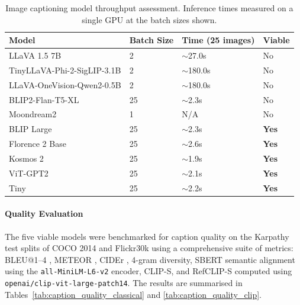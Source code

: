 \begin{table}[ht]
	\centering
	\caption{Image captioning model throughput assessment. Inference times 
		measured on a single GPU at the batch sizes shown.}
	\label{tab:caption_viability}
	\begin{tabular}{llll}
		\hline
		\textbf{Model} & \textbf{Batch Size} & \textbf{Time (25 images)} & 
		\textbf{Viable} \\
		\hline
		LLaVA 1.5 7B \cite{Liu_2023_LLaVA}      & 2  & $\sim$27.0s   & No \\
		TinyLLaVA-Phi-2-SigLIP-3.1B              & 2  & $\sim$180.0s  & No \\
		LLaVA-OneVision-Qwen2-0.5B               & 2  & $\sim$180.0s  & No \\
		BLIP2-Flan-T5-XL \cite{Li_2023_BLIP2}    & 25 & $\sim$2.3s    & No \\
		Moondream2                                & 1  & N/A           & No \\
		BLIP Large \cite{Li_2022_BLIP}           & 25 & $\sim$2.3s    & \textbf{Yes} \\
		Florence 2 Base \cite{Xiao_2024_Florence2}& 25 & $\sim$2.6s    & \textbf{Yes} \\
		Kosmos 2 \cite{Peng_2023_Kosmos2}        & 25 & $\sim$1.9s    & \textbf{Yes} \\
		ViT-GPT2                                  & 25 & $\sim$2.1s    & \textbf{Yes} \\
		Tiny                                      & 25 & $\sim$2.2s    & \textbf{Yes} \\
		\hline
	\end{tabular}
\end{table}

\paragraph{Quality Evaluation}
The five viable models were benchmarked for caption quality on the 
Karpathy test splits of COCO 2014 \cite{Lin_2014_COCO} and Flickr30k 
\cite{Young_2014_Flickr30k} using a comprehensive suite of metrics: 
BLEU@1--4 \cite{Papineni_2002_BLEU}, METEOR \cite{Banerjee_2005_METEOR}, 
CIDEr \cite{Vedantam_2015_CIDEr}, 4-gram diversity, SBERT semantic 
alignment \cite{Reimers_2019_SBERT} using the \texttt{all-MiniLM-L6-v2} 
encoder, CLIP-S, and RefCLIP-S \cite{Hessel_2021_CLIPScore} computed 
using \texttt{openai/clip-vit-large-patch14}. The results are summarised 
in Tables~\ref{tab:caption_quality_classical} and 
\ref{tab:caption_quality_clip}.

